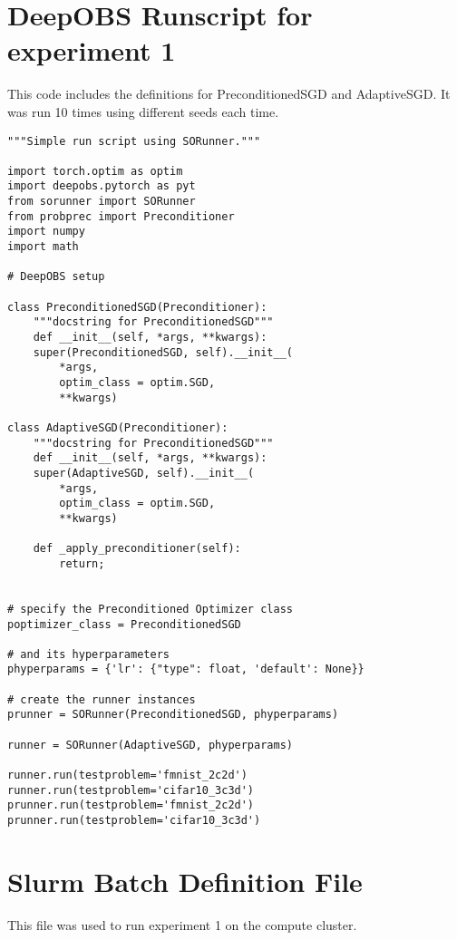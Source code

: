 \documentclass[twoside,12pt,a4paper]{report}
\begin{document}
\section{DeepOBS Runscript for experiment 1}
This code includes the definitions for PreconditionedSGD and AdaptiveSGD. It was run 10 times using different seeds each time.
\begin{verbatim}
"""Simple run script using SORunner."""

import torch.optim as optim
import deepobs.pytorch as pyt
from sorunner import SORunner
from probprec import Preconditioner
import numpy
import math

# DeepOBS setup

class PreconditionedSGD(Preconditioner):
    """docstring for PreconditionedSGD"""
    def __init__(self, *args, **kwargs):
    super(PreconditionedSGD, self).__init__(
        *args,
        optim_class = optim.SGD,
        **kwargs)

class AdaptiveSGD(Preconditioner):
    """docstring for PreconditionedSGD"""
    def __init__(self, *args, **kwargs):
    super(AdaptiveSGD, self).__init__(
        *args,
        optim_class = optim.SGD,
        **kwargs)

    def _apply_preconditioner(self):
        return;


# specify the Preconditioned Optimizer class
poptimizer_class = PreconditionedSGD

# and its hyperparameters
phyperparams = {'lr': {"type": float, 'default': None}}

# create the runner instances
prunner = SORunner(PreconditionedSGD, phyperparams)

runner = SORunner(AdaptiveSGD, phyperparams)

runner.run(testproblem='fmnist_2c2d')
runner.run(testproblem='cifar10_3c3d')
prunner.run(testproblem='fmnist_2c2d')
prunner.run(testproblem='cifar10_3c3d')

\end{verbatim}

\section{Slurm Batch Definition File}
This file was used to run experiment 1 on the compute cluster.
\end{document}
